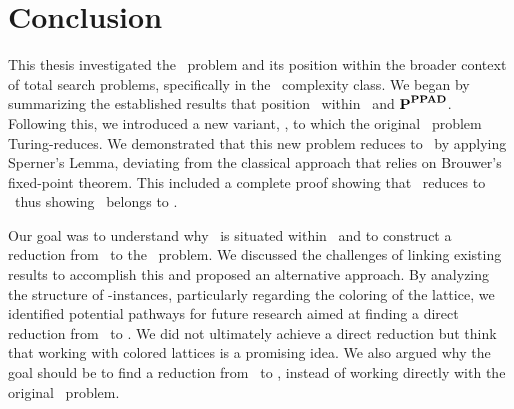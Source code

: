 \chapter{Conclusion}\label{ch:conclusion}

This thesis investigated the \Tarski\ problem and its position within the broader context of total search problems, specifically in the \TFNP\ complexity class. We began by summarizing the established results that position \Tarski\ within \PLS\ and ${\textbf{P}}^{\textbf{PPAD}}$. Following this, we introduced a new variant, \Tarskistar, to which the original \Tarski\ problem Turing-reduces. We demonstrated that this new problem reduces to \EndOfLine\ by applying Sperner's Lemma, deviating from the classical approach that relies on Brouwer's fixed-point theorem. This included a complete proof showing that \Sperner\ reduces to \EndOfLine\ thus showing \Tarski\ belongs to \PPAD\@.

Our goal was to understand why \Tarski\ is situated within \EOPL\ and to construct a reduction from \Tarski\ to the \EndOfPotentialLine\ problem. We discussed the challenges of linking existing results to accomplish this and proposed an alternative approach. By analyzing the structure of \Tarski-instances, particularly regarding the coloring of the lattice, we identified potential pathways for future research aimed at finding a direct reduction from \Tarski\ to \EndOfPotentialLine. We did not ultimately achieve a direct reduction but think that working with colored lattices is a promising idea. We also argued why the goal should be to find a reduction from \Tarskistar\ to \EndOfPotentialLine\@, instead of working directly with the original \Tarski\ problem.